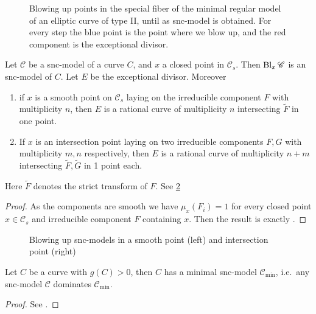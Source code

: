 \begin{figure}[ht]
    \centering
    \caption{Blowing up points in the special fiber of the minimal regular model of an elliptic curve of type II, until as snc-model is obtained. 
    For every step the blue point is the point where we blow up, and the red component is the exceptional divisor. }
    \label{fig:snc_model_curve_type_ii}
\end{figure}


\begin{lemma}\label{lem:blowup_snc}
	Let $\mathscr C$ be a snc-model of a curve $C$, and $x$ a closed point in $\mathscr C_s$. 
	Then $\operatorname{Bl}_x\mathscr C$ is an snc-model of $C$. Let $E$ be the exceptional divisor. 
	Moreover 
	\begin{enumerate}
		\item if $x$ is a smooth point on $\mathscr C_s$ laying on the irreducible component $F$ with multiplicity $n$, then $E$ is a rational curve of multiplicity $n$ intersecting $\tilde F$ in one point. 
		\item If $x$ is an intersection point laying on two irreducible components $F, G$ with multiplicity  $m, n$ respectively, then $E$ is a rational curve of multiplicity $n + m$ intersecting $\tilde F, \tilde G$ in 1 point each. 
	\end{enumerate}
	Here $\tilde F$ denotes the strict transform of $F$. 
	See \cref{fig:blowup-snc}
\end{lemma}
\begin{proof}
	As the components are smooth we have $\mu_x(F_i) = 1 $ for every closed point $x \in \mathscr C_s$ and irreducible component  $F$ containing $x$. 
	Then the result is exactly \cite[exercise 9.2.9(a)]{liuAlgebraicGeometryArithmetic2002}.
\end{proof}
\begin{figure}[ht]
    \centering
    \caption{Blowing up snc-models in a smooth point (left) and intersection point (right)}
    \label{fig:blowup-snc}
\end{figure}




\begin{theorem}\label{thm:minimal_snc_model}
	Let $C$ be a curve with  $g(C) > 0$, then $C$ has a minimal snc-model $\mathscr C_\text{min} $, i.e.\ any snc-model $\mathscr C$ dominates $\mathscr C_\text{min} $. 
\end{theorem}
\begin{proof}
	See \cite[prop.\ 9.3.36]{liuAlgebraicGeometryArithmetic2002}.
\end{proof}

